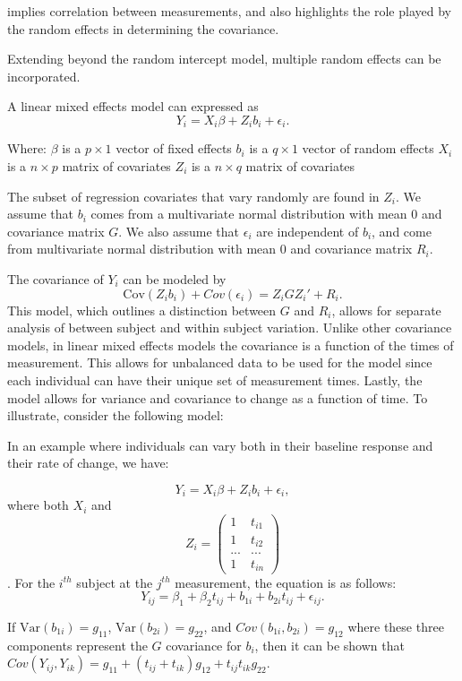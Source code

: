 \documentclass[12pt, twoside]{amherstthesis}
\begin{document}
implies correlation between measurements, and also highlights the role played by the random effects in determining the covariance.

Extending beyond the random intercept model, multiple random effects can be incorporated.

A linear mixed effects model can expressed as \[Y_i = X_i\beta+Z_ib_i+\epsilon_i.\]

Where:
\(\beta\) is a \(p \times 1\) vector of fixed effects
\(b_i\) is a \(q \times 1\) vector of random effects
\(X_i\) is a \(n \times p\) matrix of covariates
\(Z_i\) is a \(n \times q\) matrix of covariates

The subset of regression covariates that vary randomly are found in \(Z_i\). We assume that \(b_i\) comes from a multivariate normal distribution with mean 0 and covariance matrix \(G\). We also assume that \(\epsilon_i\) are independent of \(b_i\), and come from multivariate normal distribution with mean 0 and covariance matrix \(R_i\).

The covariance of \(Y_i\) can be modeled by \[\text{Cov}(Z_ib_i) + Cov(\epsilon_i) = Z_iGZ_i' + R_i.\] This model, which outlines a distinction between \(G\) and \(R_i\), allows for separate analysis of between subject and within subject variation. Unlike other covariance models, in linear mixed effects models the covariance is a function of the times of measurement. This allows for unbalanced data to be used for the model since each individual can have their unique set of measurement times. Lastly, the model allows for variance and covariance to change as a function of time. To illustrate, consider the following model:

In an example where individuals can vary both in their baseline response and their rate of change, we have:

\[Y_i = X_i\beta+Z_ib_i+\epsilon_i,\] where both \(X_i\) and \[Z_i = \begin{pmatrix} 1 & t_{i1} \\ 1 & t_{i2} \\ ... & ... \\ 1 & t_{in}\end{pmatrix}\]. For the \(i^{th}\) subject at the \(j^{th}\) measurement, the equation is as follows: \[Y_{ij} = \beta_1 + \beta_2t_{ij} +b_{1i} + b_{2i}t_{ij} + \epsilon_{ij}.\]

If \(\text{Var}(b_{1i}) = g_{11}\), \(\text{Var}(b_{2i}) = g_{22}\), and \(Cov(b_{1i},b_{2i}) = g_{12}\) where these three components represent the \(G\) covariance for \(b_i\), then
it can be shown that \(Cov(Y_{ij}, Y_{ik}) = g_{11} + (t_{ij} + t_{ik})g_{12} + t_{ij}t_{ik}g_{22}\).
\end{document}
